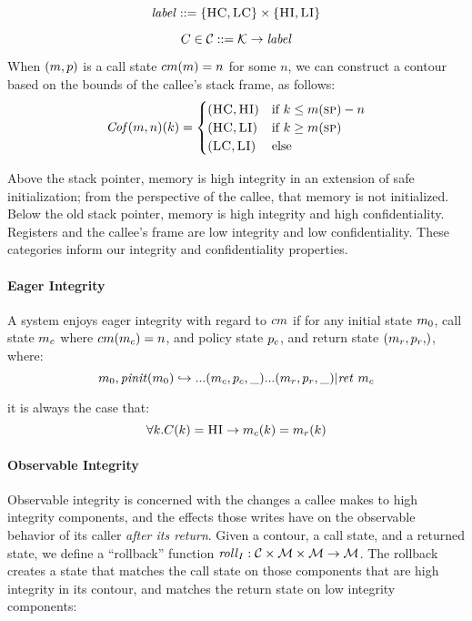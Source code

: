 \documentclass[conference]{IEEEtran}
\begin{document}
      \[\mathit{label} ::= \{\textsc{HC},\textsc{LC}\} \times \{\textsc{HI},\textsc{LI}\}\]

      \[C \in {\mathcal C} ::= {\mathcal K} \rightarrow \mathit{label}\]

      When \((m,p)\) is a call state \(cm(m) = n\) for some \(n\),
      we can construct a contour based on the bounds of the callee's stack frame, as follows:
      \[\mathit{Cof}(m,n)(k) =
      \begin{cases}
        (\textsc{HC},\textsc{HI}) & \text{if } k \leq m(\textsc{sp}) - n \\
        (\textsc{HC},\textsc{LI}) & \text{if } k \geq m(\textsc{sp}) \\
        (\textsc{LC},\textsc{LI}) & \text{else} \\
      \end{cases}\]

      Above the stack pointer, memory is high integrity in an extension of safe initialization;
      from the perspective of the callee, that memory is not initialized. Below the old stack
      pointer, memory is high integrity and high confidentiality. Registers and the callee's frame
      are low integrity and low confidentiality. These categories inform our integrity and
      confidentiality properties.

    \paragraph{Eager Integrity}

      A system enjoys eager integrity with regard to \(cm\) if for any initial state \(m_0\),
      call state \(m_c\) where \(cm(m_c) = n\), and policy state \(p_c\), and
      return state \(\mpstate{\mach_r,\pol_r}\), where:
      \[m_0,\mathit{pinit}(m_0) \hookrightarrow ... (m_c,p_c,\_) ...
        (m_r,p_r,\_) | \mathit{ret}\ m_c\]

      it is always the case that:
      \[\forall k . C(k) = \textsc{HI} \rightarrow m_c(k) = m_r(k)\]

    \paragraph{Observable Integrity}

      Observable integrity is concerned with the changes a callee makes to high integrity components,
      and the effects those writes have on the observable behavior of its caller
      {\it after its return}. Given a contour, a call state, and a returned state, we define
      a ``rollback'' function \(\mathit{roll}_I : {\mathcal C} \times {\mathcal M} \times {\mathcal M}
      \rightarrow {\mathcal M}\). The rollback creates a state that matches the call
      state on those components that are high integrity in its contour, and matches the return state
      on low integrity components:
\end{document}

